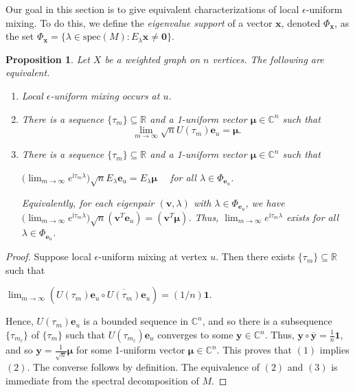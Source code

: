\documentclass[11pt]{article}
\newtheorem{proposition}{Proposition}
\newcommand{\be}{\mathbf e}
\newcommand{\bv}{\mathbf v}
\newcommand{\bx}{\mathbf x}
\newcommand{\by}{\mathbf y}
\newcommand{\bmu}{{\boldsymbol{\mu}}}
\newcommand{\one}{\mathbf 1}
\newcommand{\zero}{\mathbf 0}
\def\ii{\mathrm{i}}
\newcommand\spec{{\mathrm{spec}}}
\newcommand{\supp}{{\Phi}}
\def\C{\mathbb{C}}
\def\R{\mathbb{R}}
\begin{document}
Our goal in this section is to give equivalent characterizations of local $\epsilon$-uniform mixing. To do this,
we define the \textit{eigenvalue support} of a vector $\bx$, denoted $\supp_{\bx}$, as the set $\supp_{\bx}=\{\lambda\in\spec(M):E_{\lambda}\bx\neq\zero\}.$

\begin{proposition}
\label{proplum}
Let $X$ be a weighted graph on $n$ vertices. The following are equivalent.
\begin{enumerate}
\item Local $\epsilon$-uniform mixing occurs at $u$.
\item There is a sequence $\{\tau_m\}\subseteq\R$ and a 1-uniform vector $\bmu\in\C^n$ such that
\begin{equation}
\label{locum}
\lim_{m\rightarrow\infty}\sqrt{n}U(\tau_m)\be_u=\bmu.
\end{equation}
\item There is a sequence $\{\tau_m\}\subseteq\R$ and a 1-uniform vector $\bmu\in\C^n$ such that 
\begin{center}
$\big(\displaystyle\lim_{m\rightarrow\infty}e^{\ii \tau_m\lambda}\big)\sqrt{n}E_\lambda\be_u=E_\lambda\bmu\quad $ for all $\lambda\in\supp_{\be_u}$.
\end{center}
Equivalently, for each eigenpair $(\bv,\lambda)$ with $\lambda\in\supp_{\be_u}$, we have $\big(\displaystyle\lim_{m\rightarrow\infty}e^{\ii\tau_m\lambda}\big)\sqrt{n}(\bv^T\be_u)=(\bv^T\bmu)$. Thus, $\displaystyle\lim_{m\rightarrow\infty}e^{\ii\tau_m\lambda}$ exists for all  $\lambda\in\supp_{\be_u}$.
\end{enumerate}
\end{proposition}

\begin{proof}
Suppose local $\epsilon$-uniform mixing at vertex $u$. Then there exists $\{\tau_m\}\subseteq\R$ such that
\begin{center}
$\displaystyle\lim_{m\rightarrow\infty}\left(U(\tau_m)\be_u\circ \overline{U(\tau_m)}\be_u\right)=(1/n)\one.$
\end{center}
Hence, $U(\tau_m)\be_u$ is a bounded sequence in $\C^{n}$, and so there is a subsequence $\{\tau_{m_\ell}\}$ of $\{\tau_m\}$ such that $U(\tau_{m_\ell})\be_u$ converges to some $\by\in\C^n$. Thus, $\by\circ\overline{\by}=\frac{1}{n}\one$, and so $\by=\frac{1}{\sqrt{n}}\bmu$ for some 1-uniform vector $\bmu\in\C^n$. This proves that $(1)$ implies $ (2)$. The converse follows by definition. The equivalence of $(2)$ and $(3)$ is immediate from the spectral decomposition of $M$. 
\end{proof}
\end{document}
